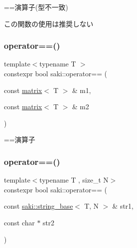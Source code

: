 ==演算子(型不一致) 

この関数の使用は推奨しない \mbox{\label{namespacesaki_a67e5e15cae6e9152e0bd5ac2e1705da4}} 
\subsubsection{\texorpdfstring{operator==()}{operator==()}\hspace{0.1cm}{\footnotesize\ttfamily [10/14]}}
{\footnotesize\ttfamily template$<$typename T $>$ \\
constexpr bool saki\+::operator== (\begin{DoxyParamCaption}\item[{const \mbox{\hyperlink{classsaki_1_1matrix}{matrix}}$<$ T $>$ \&}]{m1,  }\item[{const \mbox{\hyperlink{classsaki_1_1matrix}{matrix}}$<$ T $>$ \&}]{m2 }\end{DoxyParamCaption})}



==演算子 

\mbox{\label{namespacesaki_a1f5c975d021d701e0360608eb7a872eb}} 
\subsubsection{\texorpdfstring{operator==()}{operator==()}\hspace{0.1cm}{\footnotesize\ttfamily [11/14]}}
{\footnotesize\ttfamily template$<$typename T , size\+\_\+t N$>$ \\
constexpr bool saki\+::operator== (\begin{DoxyParamCaption}\item[{const \mbox{\hyperlink{classsaki_1_1string__base}{saki\+::string\+\_\+base}}$<$ T, N $>$ \&}]{str1,  }\item[{const char $\ast$}]{str2 }\end{DoxyParamCaption})}

\mbox{\label{namespacesaki_a1ffbf8122dda5209dc384e64747bec32}} 
